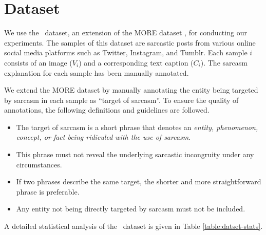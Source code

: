 \section{Dataset}\label{sec:dataset}
We use the \dataset\ dataset, an extension of the MORE dataset \citep{Desai_Chakraborty_Akhtar_2022}, for conducting our experiments. The samples of this dataset are sarcastic posts from various online social media platforms such as Twitter, Instagram, and Tumblr. Each sample $i$ consists of an image ($V_i$) and a corresponding text caption ($C_i$). The sarcasm explanation for each sample has been manually annotated. 

We extend the MORE dataset by manually annotating the entity being targeted by sarcasm in each sample as ``target of sarcasm''. To ensure the quality of annotations, the following definitions and guidelines are followed.
\begin{itemize}[leftmargin=1em, noitemsep, nolistsep]
    \item The target of sarcasm is a short phrase that denotes an \textit{entity, phenomenon, concept, or fact being ridiculed with the use of sarcasm}.
    \item This phrase must not reveal the underlying sarcastic incongruity under any circumstances. 
    \item If two phrases describe the same target, the shorter and more straightforward phrase is preferable. 
    \item Any entity not being directly targeted by sarcasm must not be included. 
\end{itemize}
A detailed statistical analysis of the \dataset\ dataset is given in Table \ref{table:datset-stats}.